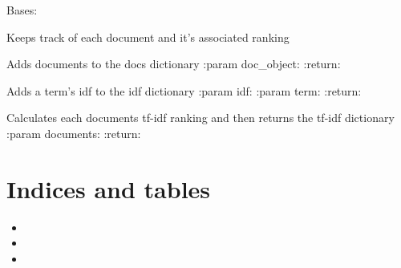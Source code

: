 \documentclass[letterpaper,10pt,english]{sphinxmanual}
\begin{document}
\begin{fulllineitems}
\label{\detokenize{tfidf:tfidf.results_tfidf}}
Bases: 

Keeps track of each document and it's associated ranking

\begin{fulllineitems}
\label{\detokenize{tfidf:tfidf.results_tfidf.add_documents}}
Adds documents to the docs dictionary
:param doc\_object:
:return:

\end{fulllineitems}


\begin{fulllineitems}
\label{\detokenize{tfidf:tfidf.results_tfidf.add_idf}}
Adds a term's idf to the idf dictionary
:param idf:
:param term:
:return:

\end{fulllineitems}


\begin{fulllineitems}
\label{\detokenize{tfidf:tfidf.results_tfidf.calc_tf_idf}}
Calculates each documents tf-idf ranking and then returns the
tf-idf dictionary
:param documents:
:return:

\end{fulllineitems}


\end{fulllineitems}



\chapter{Indices and tables}
\label{\detokenize{index:indices-and-tables}}\begin{itemize}
\item {} 

\item {} 

\item {} 

\end{itemize}
\end{document}
